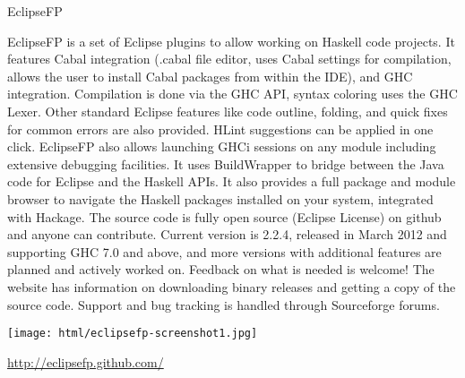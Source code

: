 \begin{hcarentry}[updated]{EclipseFP}
\makeheader

EclipseFP is a set of Eclipse plugins to allow working on Haskell code projects.
It features Cabal integration (.cabal file editor, uses Cabal settings for compilation, allows the user to install Cabal packages from within the IDE), and GHC integration. Compilation is done via the GHC API, syntax coloring uses the GHC Lexer. Other standard Eclipse features like code outline, folding, and quick fixes for common errors are also provided. HLint suggestions can be applied in one click. EclipseFP also allows launching GHCi sessions on any module including extensive debugging facilities. It uses BuildWrapper to bridge between the Java code for Eclipse and the Haskell APIs. It also provides a full package and module browser to navigate the Haskell packages installed on your system, integrated with Hackage.
The source code is fully open source (Eclipse License) on github and anyone can contribute. Current version is 2.2.4, released in March 2012 and supporting GHC 7.0 and above, and more versions with additional features are planned and actively worked on. Feedback on what is needed is welcome! The website has information on downloading binary releases and getting a copy of the source code. Support and bug tracking is handled through Sourceforge forums.

\begin{center}
\texttt{[image: html/eclipsefp-screenshot1.jpg]}
\end{center}

\FurtherReading 
\url{http://eclipsefp.github.com/}
\end{hcarentry}
